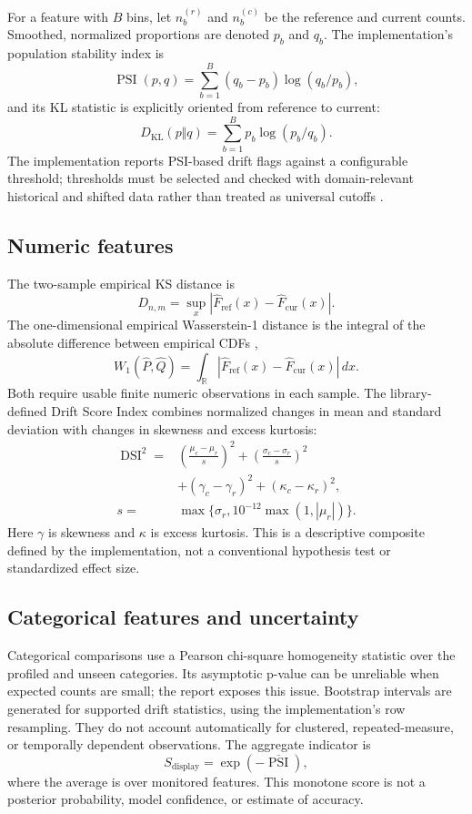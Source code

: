 \documentclass[conference]{IEEEtran}
\begin{document}
For a feature with \(B\) bins, let \(n_b^{(r)}\) and \(n_b^{(c)}\) be the reference and current counts. Smoothed, normalized proportions are denoted \(p_b\) and \(q_b\). The implementation's population stability index is
\[
\operatorname{PSI}(p,q)=\sum_{b=1}^{B}(q_b-p_b)\log(q_b/p_b),
\]
and its KL statistic is explicitly oriented from reference to current:
\[
D_{\mathrm{KL}}(p\Vert q)=\sum_{b=1}^{B}p_b\log(p_b/q_b).
\]
The implementation reports PSI-based drift flags against a configurable threshold; thresholds must be selected and checked with domain-relevant historical and shifted data rather than treated as universal cutoffs \cite{software}.

\subsection{Numeric features}
The two-sample empirical KS distance is \cite{smirnov1948}
\[
D_{n,m}=\sup_x|\widehat F_{\mathrm{ref}}(x)-\widehat F_{\mathrm{cur}}(x)|.
\]
The one-dimensional empirical Wasserstein-1 distance is the integral of the absolute difference between empirical CDFs \cite{arjovsky2017},
\[
W_1(\widehat P,\widehat Q)=\int_{\mathbb R}|\widehat F_{\mathrm{ref}}(x)-\widehat F_{\mathrm{cur}}(x)|\,dx.
\]
Both require usable finite numeric observations in each sample. The library-defined Drift Score Index combines normalized changes in mean and standard deviation with changes in skewness and excess kurtosis:
\[
\begin{aligned}
\operatorname{DSI}^2={}&
\left(\frac{\mu_c-\mu_r}{s}\right)^2
+\left(\frac{\sigma_c-\sigma_r}{s}\right)^2\\
&+(\gamma_c-\gamma_r)^2+(\kappa_c-\kappa_r)^2,\\
s={}&\max\{\sigma_r,10^{-12}\max(1,|\mu_r|)\}.
\end{aligned}
\]
Here \(\gamma\) is skewness and \(\kappa\) is excess kurtosis. This is a descriptive composite defined by the implementation, not a conventional hypothesis test or standardized effect size.

\subsection{Categorical features and uncertainty}
Categorical comparisons use a Pearson chi-square homogeneity statistic over the profiled and unseen categories. Its asymptotic p-value can be unreliable when expected counts are small; the report exposes this issue. Bootstrap intervals are generated for supported drift statistics, using the implementation's row resampling. They do not account automatically for clustered, repeated-measure, or temporally dependent observations. The aggregate indicator is
\[
S_{\mathrm{display}}=\exp(-\overline{\operatorname{PSI}}),
\]
where the average is over monitored features. This monotone score is not a posterior probability, model confidence, or estimate of accuracy.
\end{document}
